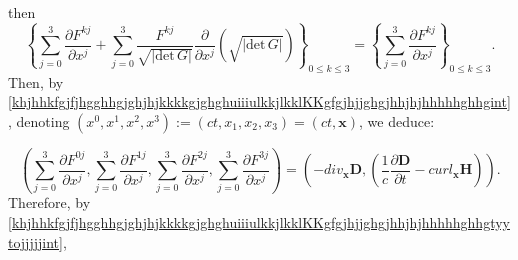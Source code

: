 \documentclass{article}
\theoremstyle{definition}
\theoremstyle{remark}
\renewcommand{\vec}[1]{\mathbf{#1}}
\newcommand{\er}{\eqref}
\newcommand{\er}{\eqref}
\begin{document}
then
\begin{equation}\label{MaxVacFullPPNhjjghjjkjhhoujiiikjjihjhiuiuint}
\left\{\sum_{j=0}^{3}\frac{\partial F^{kj}}{\partial
x^j}+\sum_{j=0}^{3}\frac{F^{kj}}{\sqrt{|\text{det}\,G|}}\frac{\partial}{\partial
x^j}\left(\sqrt{|\text{det}\,G|}\right)\right\}_{0\leq k\leq
3}=\left\{\sum_{j=0}^{3}\frac{\partial F^{kj}}{\partial
x^j}\right\}_{0\leq k\leq 3}.
\end{equation}
Then, by
\er{khjhhkfgjfjhgghhgjghjhjkkkkgjghghuiiiulkkjlkklKKgfgjhjjghgjhhjhjhhhhhghhgint},
denoting $(x^0,x^1,x^2,x^3):=(ct,x_1,x_2,x_3)=(ct,\vec x)$, we
deduce:
%
%
%
\begin{comment}
\begin{equation}\label{khjhhkfgjfjhgghhgjghjhjkkkkgjghghuiiiulkkjlkklKKgfgjhjjghgjhhjhjhhhhhghhgtyytojjjint}
\begin{cases}
\sum_{j=0}^{3}\frac{\partial F^{0j}}{\partial x^j}=-div_{\vec x}\vec D\\
\sum_{j=0}^{3}\frac{\partial F^{1j}}{\partial x^j}=\frac{1}{c}\frac{\partial D_1}{\partial t}-\left(\frac{\partial H_3}{\partial x_2}-\frac{\partial H_2}{\partial x_3}\right)\\
\sum_{j=0}^{3}\frac{\partial F^{2j}}{\partial x^j}=\frac{1}{c}\frac{\partial D_2}{\partial t}-\left(\frac{\partial H_1}{\partial x_3}-\frac{\partial H_3}{\partial x_1}\right)\\
\sum_{j=0}^{3}\frac{\partial F^{3j}}{\partial
x^j}=\frac{1}{c}\frac{\partial D_3}{\partial t}-\left(\frac{\partial
H_2}{\partial x_1}-\frac{\partial H_1}{\partial x_2}\right).
\end{cases}
\end{equation}
I.e.:
\end{comment}
%
%
%
\begin{equation}\label{khjhhkfgjfjhgghhgjghjhjkkkkgjghghuiiiulkkjlkklKKgfgjhjjghgjhhjhjhhhhhghhgtyytojjjjjint}
\left(\sum_{j=0}^{3}\frac{\partial F^{0j}}{\partial
x^j},\sum_{j=0}^{3}\frac{\partial F^{1j}}{\partial
x^j},\sum_{j=0}^{3}\frac{\partial F^{2j}}{\partial
x^j},\sum_{j=0}^{3}\frac{\partial F^{3j}}{\partial
x^j}\right)=\left(-div_{\vec x}\vec D,
\left(\frac{1}{c}\frac{\partial \vec D}{\partial t}-curl_{\vec
x}\vec H\right)\right).
\end{equation}
Therefore, by
\er{khjhhkfgjfjhgghhgjghjhjkkkkgjghghuiiiulkkjlkklKKgfgjhjjghgjhhjhjhhhhhghhgtyytojjjjjint},
\end{document}
